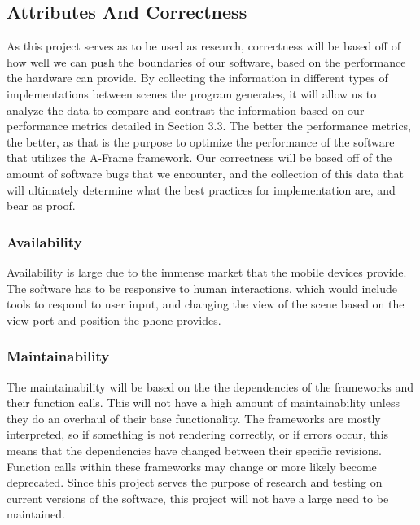 \documentclass[letterpaper,10pt,draftclsnofoot,onecolumn,compsoc]{IEEEtran}
\begin{document}
\begin{singlespace}
\subsection{Attributes And Correctness}
\begin{singlespace}
\noindent
As this project serves as to be used as research, correctness will be based off of how well we can push the boundaries of our software, based on the performance the hardware can provide. By collecting the information in different types of implementations between scenes the program generates, it will allow us to analyze the data to compare and contrast the information based on our performance metrics detailed in Section 3.3. The better the performance metrics, the better, as that is the purpose to optimize the performance of the software that utilizes the A-Frame framework. Our correctness will be based off of the amount of software bugs that we encounter, and the collection of this data that will ultimately determine what the best practices for implementation are, and bear as proof.
\end{singlespace}

\subsubsection{Availability}
\begin{singlespace}
\noindent
Availability is large due to the immense market that the mobile devices provide. The software has to be responsive to human interactions, which would include tools to respond to user input, and changing the view of the scene based on the view-port and position the phone provides.
\end{singlespace}

\subsubsection{Maintainability}
\begin{singlespace}
\noindent
The maintainability will be based on the the dependencies of the frameworks and their function calls. This will not have a high amount of maintainability unless they do an overhaul of their base functionality. The frameworks are mostly interpreted, so if something is not rendering correctly, or if errors occur, this means that the dependencies have changed between their specific revisions. Function calls within these frameworks may change or more likely become deprecated. Since this project serves the purpose of research and testing on current versions of the software, this project will not have a large need to be maintained.
\end{singlespace}


\end{singlespace}
\end{document}
